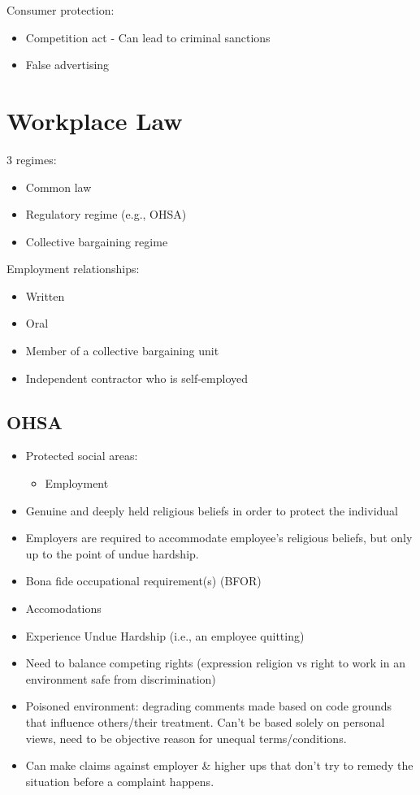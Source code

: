 \documentclass[
  letterpaper,
  landscape,
  columns=3,
  draft,
]{cheatsheet}
\begin{document}
  Consumer protection:
  \begin{itemize}
    \item Competition act - Can lead to criminal sanctions
    \item False advertising
  \end{itemize}

  \section{Workplace Law}
  3 regimes:
  \begin{itemize}
    \item Common law
    \item Regulatory regime (e.g., OHSA)
    \item Collective bargaining regime
  \end{itemize}
  Employment relationships:
  \begin{itemize}
    \item Written
    \item Oral
    \item Member of a collective bargaining unit
    \item Independent contractor who is self-employed
  \end{itemize}
  \subsection{OHSA}
  \begin{itemize}
    \item Protected social areas:
          \begin{itemize}
            \item Employment
          \end{itemize}
    \item Genuine and deeply held religious beliefs in order to protect the individual
    \item Employers are required to accommodate employee's religious beliefs, but only up to the point of undue hardship.
    \item Bona fide occupational requirement(s) (BFOR)
    \item Accomodations
    \item Experience Undue Hardship (i.e., an employee quitting)
    \item Need to balance competing rights (expression religion vs right to work in an environment safe from discrimination)
    \item Poisoned environment: degrading comments made based on code grounds that influence others/their treatment. Can't be based solely on personal views, need to be objective reason for unequal terms/conditions.
    \item Can make claims against employer \& higher ups that don't try to remedy the situation before a complaint happens.
  \end{itemize}
\end{document}
